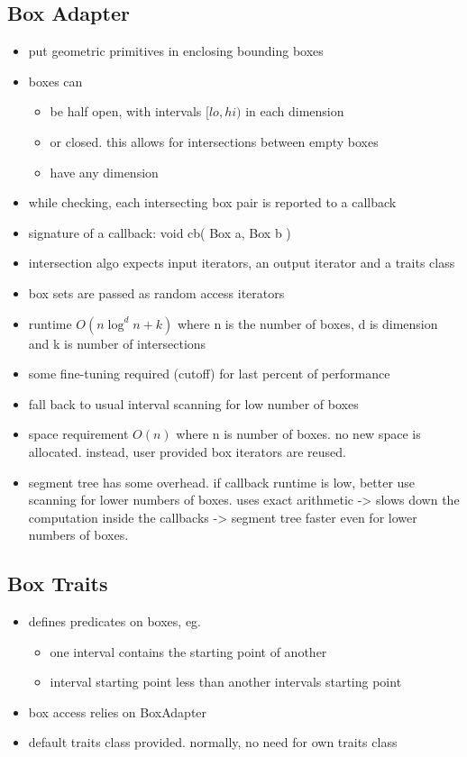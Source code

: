 \subsection*{Box Adapter}


\begin{itemize}
  \item put geometric primitives in enclosing bounding boxes
  \item boxes can 
  \begin{itemize}
    \item be half open, with intervals $[lo,hi)$ in each dimension
    \item or closed. this allows for intersections between empty boxes
    \item have any dimension
  \end{itemize}   
  \item while checking, each intersecting box pair is reported to a callback
  \item signature of a callback: void cb( Box a, Box b )
  \item intersection algo expects input iterators, an output iterator and a traits class
  \item box sets are passed as random access iterators
  \item runtime $O(n\log^{d}n+k)$ where n is the number of boxes, d is dimension and k is number of intersections
  \item some fine-tuning required (cutoff) for last percent of performance
  \item fall back to usual interval scanning for low number of boxes
  \item space requirement $O(n)$ where n is number of boxes. no new space is allocated. instead, user provided box iterators are reused.
  \item segment tree has some overhead. if callback runtime is low, better use scanning for lower numbers of boxes. \cgal uses exact arithmetic -> slows down the computation inside the callbacks -> segment tree faster even for lower numbers of boxes.
\end{itemize}



\subsection*{Box Traits}
\begin{itemize}
\item defines predicates on boxes, eg.
  \begin{itemize}
    \item one interval contains the starting point of another
    \item interval starting point less than another intervals starting point    
  \end{itemize}
\item box access relies on BoxAdapter
\item default traits class provided. normally, no need for own traits class

\end{itemize}
 
